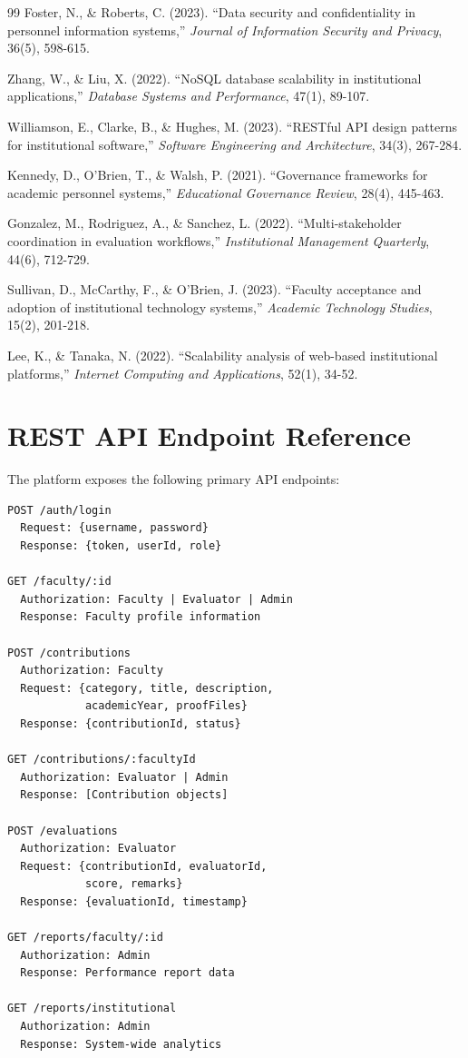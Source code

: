 \documentclass[conference]{IEEEtran}
\begin{document}
\begin{thebibliography}{99}
 Foster, N., \& Roberts, C. (2023). ``Data security and confidentiality in personnel information systems,'' \textit{Journal of Information Security and Privacy}, 36(5), 598-615.

 Zhang, W., \& Liu, X. (2022). ``NoSQL database scalability in institutional applications,'' \textit{Database Systems and Performance}, 47(1), 89-107.

 Williamson, E., Clarke, B., \& Hughes, M. (2023). ``RESTful API design patterns for institutional software,'' \textit{Software Engineering and Architecture}, 34(3), 267-284.

 Kennedy, D., O'Brien, T., \& Walsh, P. (2021). ``Governance frameworks for academic personnel systems,'' \textit{Educational Governance Review}, 28(4), 445-463.

 Gonzalez, M., Rodriguez, A., \& Sanchez, L. (2022). ``Multi-stakeholder coordination in evaluation workflows,'' \textit{Institutional Management Quarterly}, 44(6), 712-729.

 Sullivan, D., McCarthy, F., \& O'Brien, J. (2023). ``Faculty acceptance and adoption of institutional technology systems,'' \textit{Academic Technology Studies}, 15(2), 201-218.

 Lee, K., \& Tanaka, N. (2022). ``Scalability analysis of web-based institutional platforms,'' \textit{Internet Computing and Applications}, 52(1), 34-52.

\end{thebibliography}

\appendix

\section{REST API Endpoint Reference}
\label{appx:api}

The platform exposes the following primary API endpoints:

\begin{verbatim}
POST /auth/login
  Request: {username, password}
  Response: {token, userId, role}

GET /faculty/:id
  Authorization: Faculty | Evaluator | Admin
  Response: Faculty profile information

POST /contributions
  Authorization: Faculty
  Request: {category, title, description, 
            academicYear, proofFiles}
  Response: {contributionId, status}

GET /contributions/:facultyId
  Authorization: Evaluator | Admin
  Response: [Contribution objects]

POST /evaluations
  Authorization: Evaluator
  Request: {contributionId, evaluatorId, 
            score, remarks}
  Response: {evaluationId, timestamp}

GET /reports/faculty/:id
  Authorization: Admin
  Response: Performance report data

GET /reports/institutional
  Authorization: Admin
  Response: System-wide analytics
\end{verbatim}
\end{document}
